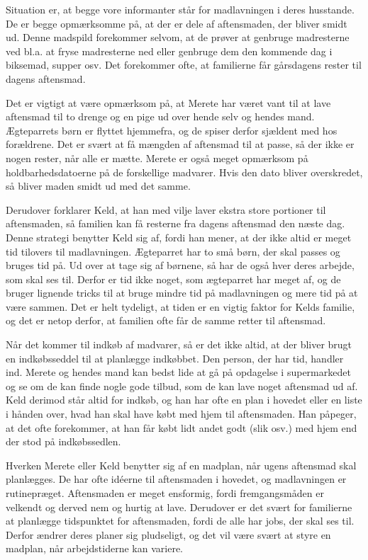 Situation er, at begge vore informanter står for madlavningen i deres husstande. De er begge opmærksomme på, at der er dele af aftensmaden, der bliver smidt ud. Denne madspild forekommer selvom, at de prøver at genbruge madresterne ved bl.a. at fryse madresterne ned eller genbruge dem den kommende dag i \fx biksemad, supper osv. Det forekommer ofte, at familierne får gårsdagens rester til dagens aftensmad.

Det er vigtigt at være opmærksom på, at Merete har været vant til at lave aftensmad til to drenge og en pige ud over hende selv og hendes mand. Ægteparrets børn er flyttet hjemmefra, og de spiser derfor sjældent med hos forældrene. Det er svært at få mængden af aftensmad til at passe, så der ikke er nogen rester, når alle er mætte. Merete er også meget opmærksom på holdbarhedsdatoerne på de forskellige madvarer. Hvis den dato bliver overskredet, så bliver maden smidt ud med det samme.

Derudover forklarer Keld, at han med vilje laver ekstra store portioner til aftensmaden, så familien kan få resterne fra dagens aftensmad den næste dag. Denne strategi benytter Keld sig af, fordi han mener, at der ikke altid er meget tid tilovers til madlavningen. Ægteparret har to små børn, der skal passes og bruges tid på. Ud over at tage sig af børnene, så har de også hver deres arbejde, som skal ses til. Derfor er tid ikke noget, som ægteparret har meget af, og de bruger lignende tricks til at bruge mindre tid på madlavningen og mere tid på at være sammen. Det er helt tydeligt, at tiden er en vigtig faktor for Kelds familie, og det er netop derfor, at familien ofte får de samme retter til aftensmad.

Når det kommer til indkøb af madvarer, så er det ikke altid, at der bliver brugt en indkøbsseddel til at planlægge indkøbbet. Den person, der har tid, handler ind. Merete og hendes mand kan bedst lide at gå på opdagelse i supermarkedet og se om de kan finde nogle gode tilbud, som de kan lave noget aftensmad ud af. Keld derimod står altid for indkøb, og han har ofte en plan i hovedet eller en liste i hånden over, hvad han skal have købt med hjem til aftensmaden. Han påpeger, at det ofte forekommer, at han får købt lidt andet godt (slik osv.) med hjem end der stod på indkøbssedlen.

Hverken Merete eller Keld benytter sig af en madplan, når ugens aftensmad skal planlægges. De har ofte idéerne til aftensmaden i hovedet, og madlavningen er rutinepræget. Aftensmaden er meget ensformig, fordi fremgangsmåden er velkendt og derved nem og hurtig at lave. Derudover er det svært for familierne at planlægge tidspunktet for aftensmaden, fordi de alle har jobs, der skal ses til. Derfor ændrer deres planer sig pludseligt, og det vil være svært at styre en madplan, når arbejdstiderne kan variere.

